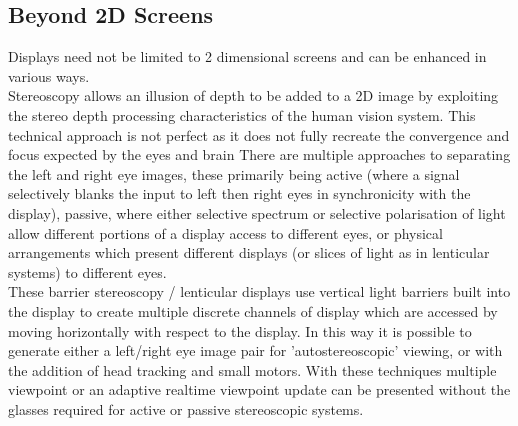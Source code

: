 \subsection{Beyond 2D Screens}
            Displays need not be limited to 2 dimensional screens and can be enhanced in various ways.\\
                Stereoscopy allows an illusion of depth to be added to a 2D image by exploiting the stereo depth processing characteristics of the human vision system. This technical approach is not perfect as it does not fully recreate the convergence and focus expected by the eyes and brain %
                There are multiple approaches to separating the left and right eye images, these primarily being active (where a signal selectively blanks the input to left then right eyes in synchronicity with the display), passive, where either selective spectrum or selective polarisation of light allow different portions of a display access to different eyes, or physical arrangements which present different displays (or slices of light as in lenticular systems) to different eyes.\\
                These barrier stereoscopy / lenticular displays use vertical light barriers built into the display to create multiple discrete channels of display which are accessed by moving horizontally with respect to the display. In this way it is possible to generate either a left/right eye image pair for 'autostereoscopic' viewing, or with the addition of head tracking and small motors. With these techniques multiple viewpoint or an adaptive realtime viewpoint update can be presented without the glasses required for active or passive stereoscopic systems. \\
